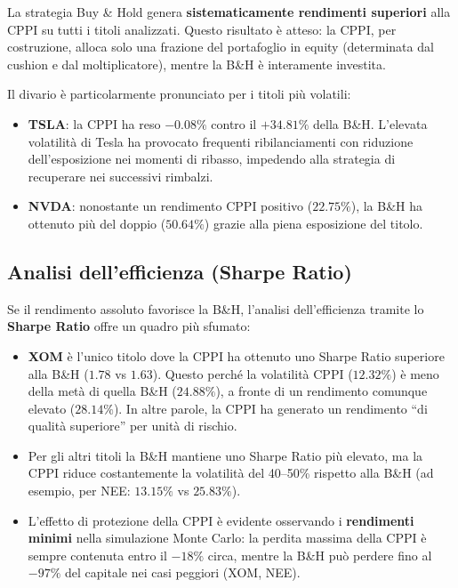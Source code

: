 \documentclass[11pt, a4paper]{report} %
\begin{document}
La strategia Buy \& Hold genera \textbf{sistematicamente rendimenti superiori} alla CPPI su tutti i titoli analizzati.  Questo risultato è atteso: la CPPI, per costruzione, alloca solo una frazione del portafoglio in equity (determinata dal cushion e dal moltiplicatore), mentre la B\&H è interamente investita.

Il divario è particolarmente pronunciato per i titoli più volatili:
\begin{itemize}
    \item \textbf{TSLA}: la CPPI ha reso $-0.08\%$ contro il $+34.81\%$ della B\&H.  L'elevata volatilità di Tesla ha provocato frequenti ribilanciamenti con riduzione dell'esposizione nei momenti di ribasso, impedendo alla strategia di recuperare nei successivi rimbalzi.
    \item \textbf{NVDA}: nonostante un rendimento CPPI positivo ($22.75\%$), la B\&H ha ottenuto più del doppio ($50.64\%$) grazie alla piena esposizione del titolo.
\end{itemize}

\subsection{Analisi dell'efficienza (Sharpe Ratio)}

Se il rendimento assoluto favorisce la B\&H, l'analisi dell'efficienza tramite lo \textbf{Sharpe Ratio} offre un quadro più sfumato:

\begin{itemize}
    \item \textbf{XOM} è l'unico titolo dove la CPPI ha ottenuto uno Sharpe Ratio superiore alla B\&H ($1.78$ vs $1.63$).  Questo perché la volatilità CPPI ($12.32\%$) è meno della metà di quella B\&H ($24.88\%$), a fronte di un rendimento comunque elevato ($28.14\%$).  In altre parole, la CPPI ha generato un rendimento ``di qualità superiore'' per unità di rischio.
    
    \item Per gli altri titoli la B\&H mantiene uno Sharpe Ratio più elevato, ma la CPPI riduce costantemente la volatilità del 40--50\% rispetto alla B\&H (ad esempio, per NEE: $13.15\%$ vs $25.83\%$).
    
    \item L'effetto di protezione della CPPI è evidente osservando i \textbf{rendimenti minimi} nella simulazione Monte Carlo: la perdita massima della CPPI è sempre contenuta entro il $-18\%$ circa, mentre la B\&H può perdere fino al $-97\%$ del capitale nei casi peggiori (XOM, NEE).
\end{itemize}
\end{document}
